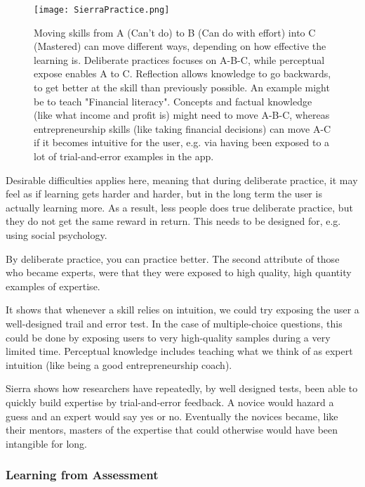   \begin{figure}[h]
    \centering
    \texttt{[image: SierraPractice.png]}
    \caption{Moving skills from A (Can't do) to B (Can do with effort) into C (Mastered) can move different ways, depending on how effective the learning is. Deliberate practices focuses on A-B-C, while perceptual expose enables A to C. Reflection allows knowledge to go backwards, to get better at the skill than previously possible. An example might be to teach "Financial literacy". Concepts and factual knowledge (like what income and profit is) might need to move A-B-C, whereas entrepreneurship skills (like taking financial decisions) can move A-C if it becomes intuitive for the user, e.g. via having been exposed to a lot of trial-and-error examples in the app.}
    \label{fig:sierra-practice}
\end{figure}

  Desirable difficulties applies here, meaning that during deliberate practice, it may feel as if learning gets harder and harder, but in the long term the user is actually learning more. As a result, less people does true deliberate practice, but they do not get the same reward in return. This needs to be designed for, e.g. using social psychology.

  By deliberate practice, you can practice better. The second attribute of those who became experts, were that they were exposed to high quality, high quantity examples of expertise. \citep{sierra}

  It shows that whenever a skill relies on intuition, we could try exposing the user a well-designed trail and error test. In the case of multiple-choice questions, this could be done by exposing users to very high-quality samples during a very limited time. Perceptual knowledge includes teaching what we think of as expert intuition (like being a good entrepreneurship coach).

  Sierra shows how researchers have repeatedly, by well designed tests, been able to quickly build expertise by trial-and-error feedback. A novice would hazard a guess and an expert would say yes or no. Eventually the novices became, like their mentors, masters of the expertise that could otherwise would have been intangible for long.

  \subsubsection{Learning from Assessment}

